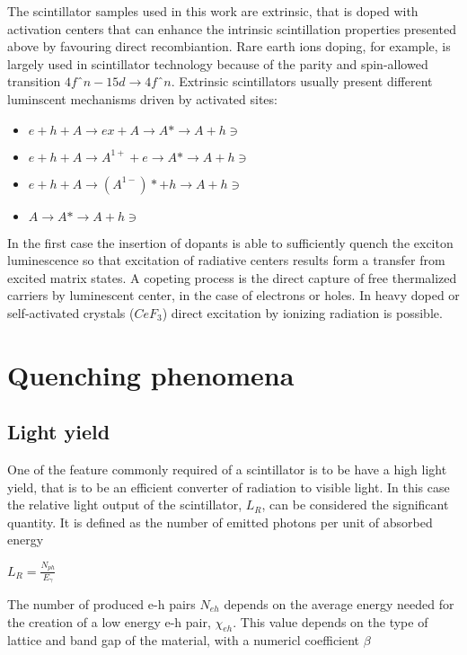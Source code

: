 The scintillator samples used in this work are extrinsic, that is doped with activation centers that can enhance the intrinsic scintillation properties presented above by favouring direct recombiantion.
Rare earth ions doping, for example, is largely used in scintillator technology because of the parity and spin-allowed transition $4fˆ{n-1}5d\rightarrow 4fˆ{n}$. 
Extrinsic scintillators usually present different luminscent mechanisms driven by activated sites\cite{Lecoq2006}:
\begin{itemize}
\item $e + h + A \rightarrow ex + A \rightarrow A* \rightarrow A + h\ni$
\item $e + h + A \rightarrow A^{1+} + e \rightarrow A* \rightarrow A + h\ni$
\item $e + h + A \rightarrow (A^{1-})* + h \rightarrow A + h\ni$
\item $A \rightarrow A* \rightarrow A + h\ni$
\end{itemize}
In the first case the insertion of dopants is able to sufficiently quench the exciton luminescence so that excitation of radiative centers results form a transfer from excited matrix states.
A copeting process is the direct capture of free thermalized carriers by luminescent center, in the case of electrons or holes.
In heavy doped or self-activated crystals ($CeF_{3}$) direct excitation by ionizing radiation is possible.


\section{Quenching phenomena}


\subsection{Light yield}
One of the feature commonly required of a scintillator is to be have a high light yield, that is to be an efficient converter of radiation to visible light.
In this case the relative light output of the scintillator, $L_{R}$, can be considered the significant quantity. It is defined as the number of emitted photons per unit of absorbed energy\cite{Rodnyi1997}

$L_{R} = \frac{N_{ph}}{E_{\gamma}}$

The number of produced e-h pairs $N_{eh}$ depends on the average energy needed for the creation of a low energy e-h pair, $\chi _{eh}$. This value depends on the type of lattice and band gap of the material, with a numericl coefficient $\beta$

